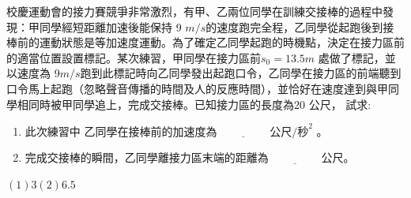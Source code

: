 \documentclass[cn,10pt,math=newtx,chinesefont=founder,device=ig]{elegantbook}
\begin{document}
\begin{example}
   校慶運動會的接力賽競爭非常激烈，有甲、乙兩位同學在訓練交接棒的過程中發現：甲同學經短距離加速後能保持 9 $m/s$的速度跑完全程，乙同學從起跑後到接棒前的運動狀態是等加速度運動。為了確定乙同學起跑的時機點，決定在接力區前的適當位置設置標記。某次練習，甲同學在接力區前$s_0=13.5m$ 處做了標記，並以速度為 9$m/s$跑到此標記時向乙同學發出起跑口令，乙同學在接力區的前端聽到口令馬上起跑（忽略聲音傳播的時間及人的反應時間），並恰好在速度達到與甲同學相同時被甲同學追上，完成交接棒。已知接力區的長度為20 公尺， 試求:
\begin{enumerate}[label=(\arabic*)] 
  \item 此次練習中 乙同學在接棒前的加速度為$\underline{\hspace{2cm}} 公尺/秒^2$ 。
  \item 完成交接棒的瞬間，乙同學離接力區末端的距離為$\underline{\hspace{2cm}} $公尺。
    \end{enumerate}
   
   
    \rightline{[復興高中教甄109]}
\end{example}
\begin{solution}
    $(1) 3  (2) 6.5$
\end{solution}

\newpage
\end{document}
